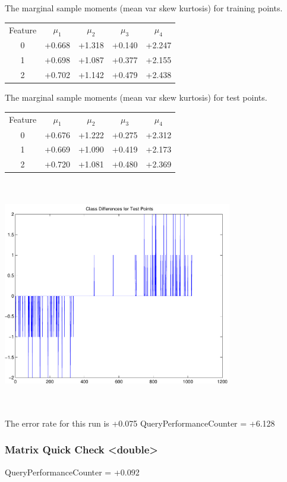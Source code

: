 \documentclass[9pt]{article}
\theoremstyle{plain}
\theoremstyle{definition}
\theoremstyle{remark}
\numberwithin{equation}{section}
\begin{document}
The marginal sample moments (mean var skew kurtosis) for training points.\newline
\begin{tabular}{ c |  c  c  c  c}
Feature & $\mu_1$ & $\mu_2$ & $\mu_3$ & $\mu_4$ \\
0 & +0.668 & +1.318 & +0.140& +2.247 \\
\hline
1 & +0.698 & +1.087 & +0.377& +2.155 \\
\hline
2 & +0.702 & +1.142 & +0.479& +2.438 \\
\hline
\end{tabular}
\newline
The marginal sample moments (mean var skew kurtosis) for test points.\newline
\begin{tabular}{ c | c  c  c  c}
Feature & $\mu_1$ & $\mu_2$ & $\mu_3$ & $\mu_4$ \\
0 & +0.676 & +1.222 & +0.275& +2.312\\
\hline
1 & +0.669 & +1.090 & +0.419& +2.173\\
\hline
2 & +0.720 & +1.081 & +0.480& +2.369\\
\hline
\end{tabular}\newline
\includegraphics[width=10.0cm,height=10.0cm]{classDiffs.pdf}

The error rate for this run is +0.075\newline
QueryPerformanceCounter  =  +6.128
\subsubsection{Matrix Quick Check <double>}
QueryPerformanceCounter  =  +0.092
\end{document}
